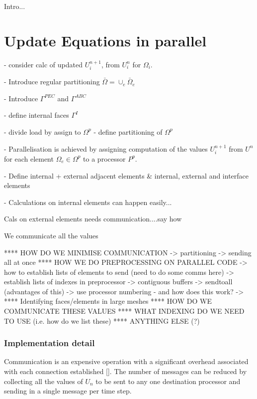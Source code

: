 Intro...

\section{Update Equations in parallel}

- consider calc of updated $U^{n+1}_i$, from $U^{n}_i$ for $\Omega_i$. 

- Introduce regular partitioning $\bar{\Omega} = \cup_{e} \bar{\Omega}_e$

- Introduce $\Gamma^{PEC}$ and $\Gamma^{ABC}$

- define internal faces $\Gamma^{I}$

- divide load by assign to $\Omega^p$ -  define partitioning of $\Omega^p$

- Parallelisation is achieved by assigning computation of the values $U^{n+1}_i$ from $U^{n}$ for each element $\Omega_e \in \Omega^p$ to a processor $P^p$.

- Define internal + external adjacent elements & internal, external and interface elements


- Calculations on internal elements can happen easily...

Cals on external elements needs communication....say how

We communicate all the values

**** HOW DO WE MINIMISE COMMUNICATION
    -> partitioning
    -> sending all at once
**** HOW WE DO PREPROCESSING ON PARALLEL CODE
    -> how to establish lists of elements to send (need to do some comms here)
    -> establish lists of indexes in preprocessor
    -> contiguous buffers
    -> sendtoall (advantages of this)
    -> use processor numbering - and how does this work?
        ->
**** Identifying faces/elements in large meshes
**** HOW DO WE COMMUNICATE THESE VALUES
**** WHAT INDEXING DO WE NEED TO USE (i.e. how do we list these)
**** ANYTHING ELSE (?)

\subsubsection{Implementation detail}

Communication is an expensive operation with a significant overhead associated with each connection established [].
The number of messages can be reduced by collecting all the values of $U_{n}$ to be sent to any one 
destination processor and sending in a single message per time step.

